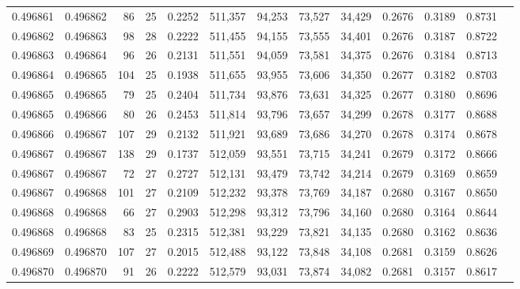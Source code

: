 \begin{tabular}{rrrrrrrrrrrrr}
0.496861 & 0.496862 &  86 &  25 &                                     0.2252 & 511,357 &  94,253 &  73,527 &  34,429 & 0.2676 & 0.3189 & 0.8731 \\
0.496862 & 0.496863 &  98 &  28 &                                     0.2222 & 511,455 &  94,155 &  73,555 &  34,401 & 0.2676 & 0.3187 & 0.8722 \\
0.496863 & 0.496864 &  96 &  26 &                                     0.2131 & 511,551 &  94,059 &  73,581 &  34,375 & 0.2676 & 0.3184 & 0.8713 \\
0.496864 & 0.496865 & 104 &  25 &                                     0.1938 & 511,655 &  93,955 &  73,606 &  34,350 & 0.2677 & 0.3182 & 0.8703 \\
0.496865 & 0.496865 &  79 &  25 &                                     0.2404 & 511,734 &  93,876 &  73,631 &  34,325 & 0.2677 & 0.3180 & 0.8696 \\
0.496865 & 0.496866 &  80 &  26 &                                     0.2453 & 511,814 &  93,796 &  73,657 &  34,299 & 0.2678 & 0.3177 & 0.8688 \\
0.496866 & 0.496867 & 107 &  29 &                                     0.2132 & 511,921 &  93,689 &  73,686 &  34,270 & 0.2678 & 0.3174 & 0.8678 \\
0.496867 & 0.496867 & 138 &  29 &                                     0.1737 & 512,059 &  93,551 &  73,715 &  34,241 & 0.2679 & 0.3172 & 0.8666 \\
0.496867 & 0.496867 &  72 &  27 &                                     0.2727 & 512,131 &  93,479 &  73,742 &  34,214 & 0.2679 & 0.3169 & 0.8659 \\
0.496867 & 0.496868 & 101 &  27 &                                     0.2109 & 512,232 &  93,378 &  73,769 &  34,187 & 0.2680 & 0.3167 & 0.8650 \\
0.496868 & 0.496868 &  66 &  27 &                                     0.2903 & 512,298 &  93,312 &  73,796 &  34,160 & 0.2680 & 0.3164 & 0.8644 \\
0.496868 & 0.496868 &  83 &  25 &                                     0.2315 & 512,381 &  93,229 &  73,821 &  34,135 & 0.2680 & 0.3162 & 0.8636 \\
0.496869 & 0.496870 & 107 &  27 &                                     0.2015 & 512,488 &  93,122 &  73,848 &  34,108 & 0.2681 & 0.3159 & 0.8626 \\
0.496870 & 0.496870 &  91 &  26 &                                     0.2222 & 512,579 &  93,031 &  73,874 &  34,082 & 0.2681 & 0.3157 & 0.8617 \\

\end{tabular}

